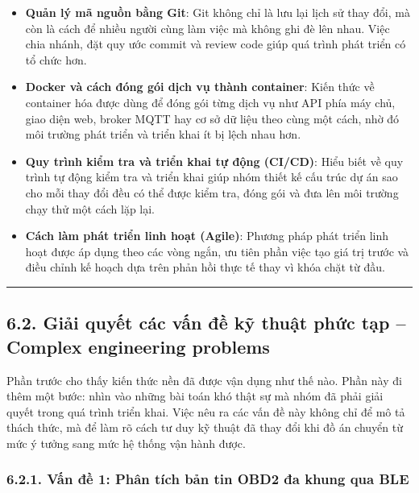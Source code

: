 \documentclass[a4paper]{extarticle}
\providecommand{\tightlist}{%
  \setlength{\itemsep}{0pt}\setlength{\parskip}{0pt}}
\begin{document}
\begin{itemize}
\tightlist
\item
  \textbf{Quản lý mã nguồn bằng Git}: Git không chỉ là lưu
  lại lịch sử thay đổi, mà còn là cách để nhiều người cùng làm việc mà
  không ghi đè lên nhau. Việc chia nhánh, đặt quy ước commit và review
  code giúp quá trình phát triển có tổ chức hơn.
\item
  \textbf{Docker và cách đóng gói dịch vụ thành container}: Kiến thức về
  container hóa được dùng để đóng gói từng dịch vụ như API phía máy chủ,
  giao diện web, broker MQTT hay cơ sở
  dữ liệu theo cùng một cách, nhờ đó môi trường phát triển và triển khai
  ít bị lệch nhau hơn.
\item
  \textbf{Quy trình kiểm tra và triển khai tự động (CI/CD)}: Hiểu biết về quy trình tự động kiểm tra và
  triển khai giúp nhóm thiết kế cấu trúc dự án sao cho mỗi thay đổi đều
  có thể được kiểm tra, đóng gói và đưa lên môi trường chạy thử một cách
  lặp lại.
\item
  \textbf{Cách làm phát triển linh hoạt (Agile)}: Phương pháp phát triển linh hoạt được áp
  dụng theo các vòng ngắn, ưu tiên phần việc tạo giá trị trước và điều
  chỉnh kế hoạch dựa trên phản hồi thực tế thay vì khóa chặt từ đầu.
\end{itemize}

\begin{center}\rule{0.5\linewidth}{0.5pt}\end{center}

\subsection{6.2. Giải quyết các vấn đề kỹ thuật phức tạp -- Complex engineering problems}\label{62-giux1ea3i-quyux1ebft-cuxe1c-vux1ea5n-ux111ux1ec1-kux1ef9-thuux1eadt-phux1ee9c-tux1ea1p--complex-engineering-problems}

Phần trước cho thấy kiến thức nền đã được vận dụng như thế nào. Phần này
đi thêm một bước: nhìn vào những bài toán khó thật sự mà nhóm đã phải
giải quyết trong quá trình triển khai. Việc nêu ra các vấn đề này không
chỉ để mô tả thách thức, mà để làm rõ cách tư duy kỹ thuật đã thay đổi
khi đồ án chuyển từ mức ý tưởng sang mức hệ thống vận hành được.

\subsubsection{6.2.1. Vấn đề 1: Phân tích bản tin OBD2 đa khung qua
BLE}\label{621-vux1ea5n-ux111ux1ec1-1-phuxe2n-tuxedch-bux1ea3n-tin-obd2-ux111a-khung-qua-ble}
\end{document}
